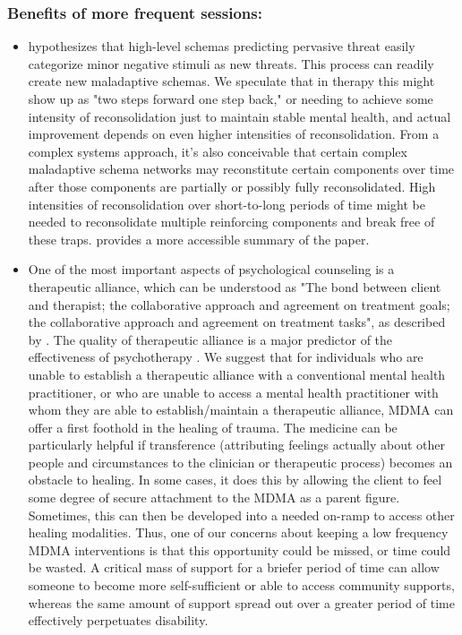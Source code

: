 \documentclass[12pt,letterpaper]{book}
\begin{document}
\subsubsection*{Benefits of more frequent sessions:}
\begin{itemize}
    \item \textcite{berghSelfEvidencing} hypothesizes that high-level schemas predicting pervasive threat easily categorize minor negative stimuli as new threats. This process can readily create new maladaptive schemas. We speculate that in therapy this might show up as "two steps forward one step back," or needing to achieve some intensity of reconsolidation just to maintain stable mental health, and actual improvement depends on even higher intensities of reconsolidation. From a complex systems approach, it's also conceivable that certain complex maladaptive schema networks may reconstitute certain components over time after those components are partially or possibly fully reconsolidated. High intensities of reconsolidation over short-to-long periods of time might be needed to reconsolidate multiple reinforcing components and break free of these traps. \textcite{alexanderPrecision} provides a more accessible summary of the paper.
    \item One of the most important aspects of psychological counseling is a therapeutic alliance, which can be understood as "The bond between client and therapist; the collaborative approach and agreement on treatment goals; the collaborative approach and agreement on treatment tasks", as described by \textcite{BRWAIdownload}. The quality of therapeutic alliance is a major predictor of the effectiveness of psychotherapy \cite{fluckiger2018alliance}. We suggest that for individuals who are unable to establish a therapeutic alliance with a conventional mental health practitioner, or who are unable to access a mental health practitioner with whom they are able to establish/maintain a therapeutic alliance, MDMA can offer a first foothold in the healing of trauma. The medicine can be particularly helpful if transference (attributing feelings actually about other people and circumstances to the clinician or therapeutic process) becomes an obstacle to healing. In some cases, it does this by allowing the client to feel some degree of secure attachment to the MDMA as a parent figure. Sometimes, this can then be developed into a needed on-ramp to access other healing modalities. Thus, one of our concerns about keeping a low frequency MDMA interventions is that this opportunity could be missed, or time could be wasted. A critical mass of support for a briefer period of time can allow someone to become more self-sufficient or able to access community supports, whereas the same amount of support spread out over a greater period of time effectively perpetuates disability.
\end{itemize}
\end{document}
